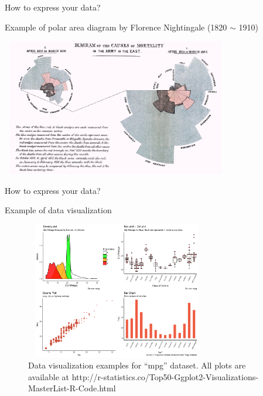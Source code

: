 \documentclass[9pt,ignorenonframetext,xcolor=dvipsnames]{beamer}
\begin{document}
\begin{frame}{How to express your data?}

\begin{block}{Example of polar area diagram by Florence Nightingale
(1820 \(\sim\) 1910)}

\begin{center}
  \includegraphics[width = 10cm, height = 6cm]{Nightingale-mortality.jpg}
\end{center}

\end{block}

\end{frame}

\begin{frame}{How to express your data?}

\begin{block}{Example of data visualization}

\begin{figure}[H]

{\centering \includegraphics[width=8cm,height=6cm]{Figures/mpg-example-1} 

}

\caption{Data visualization examples for ``mpg'' dataset. All plots are available at http://r-statistics.co/Top50-Ggplot2-Visualizations-MasterList-R-Code.html}\label{fig:mpg-example}
\end{figure}

\end{block}

\end{frame}
\end{document}
